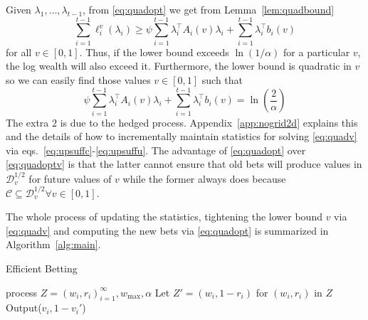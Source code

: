 Given $\lambda_1,\ldots,\lambda_{t-1}$, from \eqref{eq:quadopt} 
we get from Lemma~\ref{lem:quadbound} 
\[
\sum_{i=1}^{t-1} \ell_i^v(\lambda_i)
\geq
\psi  
 \sum_{i=1}^{t-1} \lambda_i^\top A_i(v)\lambda_i  +  \sum_{i=1}^{t-1} \lambda_i^\top b_i(v)
\]
for all $v \in [0,1]$. Thus, if the lower bound exceeds $\ln(1/\alpha)$ 
for a particular $v$, the log wealth will also exceed it. Furthermore,
the lower bound is quadratic in $v$ so we can easily find those values
$v \in [0,1]$ such that
\begin{equation}
   \psi  
 \sum_{i=1}^{t-1} \lambda_i^\top A_i(v)\lambda_i  +  \sum_{i=1}^{t-1} \lambda_i^\top b_i(v) = \ln\left(\frac{2}{\alpha}\right) 
 \label{eq:quadv}
\end{equation} 
The extra $2$ is due to the hedged process.  Appendix~\ref{app:nogrid2d}
explains this and the details of how to incrementally maintain statistics for solving
\eqref{eq:quadv} via eqs.~\eqref{eq:upsuffc}-\eqref{eq:upsuffu}.  The advantage
of \eqref{eq:quadopt} over \eqref{eq:quadoptv} is that the latter cannot ensure
that old bets will produce values in $\mathcal{D}_v^{1/2}$ for future values of
$v$ while the former always does because $\mathcal{C} \subseteq
\mathcal{D}_{v}^{1/2} \forall v \in [0,1]$. 

The whole process of updating the statistics, tightening the lower bound $v$
via \eqref{eq:quadv} and computing the new bets via \eqref{eq:quadopt} is
summarized in Algorithm~\ref{alg:main}.

\begin{algorithm}[tb]
   \caption{Efficient Betting}
   \label{alg:main}
\begin{algorithmic}
     process $Z=(w_i,r_i)_{i=1}^\infty, w_{\max}, \alpha$
    \STATE Let $Z' = (w_i,1-r_i)$ for $(w_i,r_i)$ in $Z$
        \STATE Output($v_i,1-v_i'$)
   \ENDFOR
{}
\ENDFUNCTION
\end{algorithmic}
\end{algorithm}

